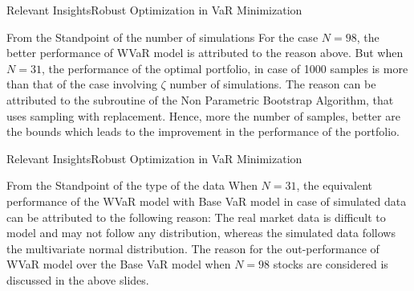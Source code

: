 \documentclass{beamer}
\begin{document}
\begin{frame}{Relevant Insights}{Robust Optimization in VaR Minimization}

\begin{block}{From the Standpoint of the number of simulations}
 For the case $N=98$, the better performance of WVaR model is attributed to the reason above. But when $N=31$, the performance of the optimal portfolio, in case of 1000 samples is more than that of the case involving $\zeta$ number of simulations. The reason can be attributed to the subroutine of the Non Parametric Bootstrap Algorithm, that uses sampling with replacement. Hence, more the number of  samples, better are the bounds which leads to the improvement in the performance of the portfolio.
\end{block}
\end{frame}
\begin{frame}{Relevant Insights}{Robust Optimization in VaR Minimization}
\begin{block}{From the Standpoint of the type of the data}
When $N=31$, the equivalent performance of the WVaR model with Base VaR model in case of simulated data can be attributed to the following reason: The real market data is difficult to model and may not follow any distribution, whereas the simulated data follows the multivariate normal distribution. The reason for the out-performance of WVaR model over the Base VaR model when $N=98$ stocks are considered is discussed in the above slides.
\end{block}
\end{frame}
\end{document}
